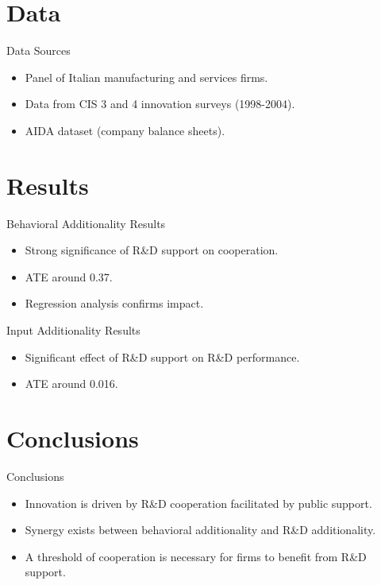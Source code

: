 \documentclass{beamer}
\begin{document}
\section{Data}
\begin{frame}{Data Sources}
    \begin{itemize}
        \item Panel of Italian manufacturing and services firms.
        \item Data from CIS 3 and 4 innovation surveys (1998-2004).
        \item AIDA dataset (company balance sheets).
    \end{itemize}
\end{frame}

\section{Results}
\begin{frame}{Behavioral Additionality Results}
    \begin{itemize}
        \item Strong significance of R\&D support on cooperation.
        \item ATE around 0.37.
        \item Regression analysis confirms impact.
    \end{itemize}
\end{frame}

\begin{frame}{Input Additionality Results}
    \begin{itemize}
        \item Significant effect of R\&D support on R\&D performance.
        \item ATE around 0.016.
    \end{itemize}
\end{frame}

\section{Conclusions}
\begin{frame}{Conclusions}
    \begin{itemize}
        \item Innovation is driven by R\&D cooperation facilitated by public support.
        \item Synergy exists between behavioral additionality and R\&D additionality.
        \item A threshold of cooperation is necessary for firms to benefit from R\&D support.
    \end{itemize}
\end{frame}
\end{document}
